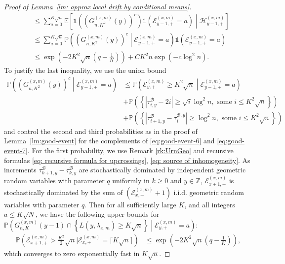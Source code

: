\documentclass[EJP]{ejpecp} %
\begin{document}
\begin{proof}[Proof of Lemma~\ref{lm: approx local drift by conditional means}]
\begin{align*}
		&\le \sum_{a = 0}^{K \sqrt{n}} \mathbb{E}\left[ \mathbb{1}\left(\left( G_{n, K^2}^{(x,m)}(y) \right) ^c \right) \mathbb{1}\left( \mathcal{E}_{y-1, +}^{(x,m)} = a \right) \middle| \mathcal{H}_{y-1, +}^{(x,m)} \right] \\
		&\le \sum_{a = 0}^{K \sqrt{n}} \mathbb{P}\left( \left( G_{n, K^2}^{(x,m)}(y) \right) ^c \middle| \mathcal{E}_{y-1, +}^{(x,m)} = a \right) \mathbb{1}\left( \mathcal{E}_{y-1, +}^{(x,m)} = a \right) \\
		&\le \exp\left( - 2 K^2 \sqrt{n} (q - \frac{1}{K}) \right) + C K^2 n \exp\left(- c \log^2 n\right)
		.
	\end{align*}
	To justify the last inequality,
	we use the union bound
	\begin{align*}
	\mathbb{P}\left( \left( G_{n, K^2}^{(x,m)}(y) \right) ^c \middle| \mathcal{E}_{y-1, +}^{(x,m)} 
	= a \right)
	&\le \mathbb{P}\left( \mathcal{E}_{y, +}^{(x,m)} \ge K^2 \sqrt{n} \middle| \mathcal{E}_{y-1, +}^{(x,m)} = a \right) \\
	&+ \mathbb{P}\left( \left\{\left|\tau_{i, y}^{\mathscr{B}}-2 i\right|\ge\sqrt{i} \log ^2 n, \text { some } i \leq K^2 \sqrt{n}\right\} \right) \\
	&+ \mathbb{P}\left( \left\{\left|\tau_{i+1, y}^{\mathscr{B}}-\tau_i^{\mathscr{B}, y}\right|\ge\log ^2 n, \text { some } i \leq K^2 \sqrt{n}\right\} \right)
	\end{align*}
	and control the second and third probabilities as in the proof of Lemma~\ref{lm:good-event} for the complements of \eqref{eq:good-event-6} and \eqref{eq:good-event-7}. For the first probability,
	we use Remark \ref{rk:UrnGeo} and recursive formulas \eqref{eq: recursive formula for upcrossings}, \eqref{eq: source of inhomogeneity}. As increments $\tau^{\mathscr{B}}_{k+1,y} -\tau^{\mathscr{B}}_{k,y}$ are stochastically dominated by independent geometric random variables with parameter $q$ uniformly in $ k \geq 0$ and $y \in \mathbb{Z}$, $\mathcal{E}_{x+1,+}^{(x,m)}$ is stochastically dominated by the sum of $ (\mathcal{E}_{x,+}^{(x,m)} +1) $ i.i.d. geometric random variables with parameter $q$. Then for all sufficiently large $K$, and all integers $a\leq K\sqrt{N}$, we have the following upper bounds for $\mathbb{P}\left( G_{n, K}^{(x,m)}(y-1)\cap \left\{L(y, \lambda_{x, m}) \ge K \sqrt{n}\right\} \middle| \mathcal{E}_{y, +}^{(x,m)}=a \right)$:
	\begin{align*}
		\mathbb{P}\left(\mathcal{E}_{x+1,+}^{(x,m)} > \frac{K^2}{2} \sqrt{n} | \mathcal{E}_{x,+}^{(x, m)} = \lceil K \sqrt{n} \rceil\right)
		&\le \exp\left( - 2 K^2 \sqrt{n}(q - \frac{1}{K})  \right) 
		,
	\end{align*}
	which converges to zero exponentially fast in $K \sqrt{n}$. 
	

\end{proof}
\end{document}
